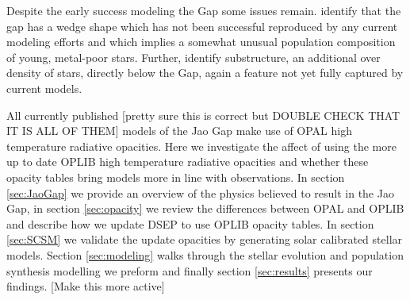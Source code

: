 Despite the early success modeling the Gap some issues remain.
\citeauthor{Jao2020} identify that the gap has a wedge shape which has not been
successful reproduced by any current modeling efforts and which implies a
somewhat unusual population composition of young, metal-poor stars. Further,
\citet{Feiden2021} identify substructure, an additional over density of stars,
directly below the Gap, again a feature not yet fully captured by current
models. 

All currently published {\color{red} [pretty sure this is correct but DOUBLE
CHECK THAT IT IS ALL OF THEM]} models of the Jao Gap make use of OPAL high
temperature radiative opacities. Here we investigate the affect of using the
more up to date OPLIB high temperature radiative opacities and whether these
opacity tables bring models more in line with observations. In section
\ref{sec:JaoGap} we provide an overview of the physics believed to result in the
Jao Gap, in section \ref{sec:opacity} we review the differences between OPAL
and OPLIB and describe how we update DSEP to use OPLIB opacity tables. In
section \ref{sec:SCSM} we validate the update opacities by generating solar
calibrated stellar models. Section \ref{sec:modeling} walks through the stellar
evolution and population synthesis modelling we preform and finally section
\ref{sec:results} presents our findings. {\color{red} [Make this more active]}

%

